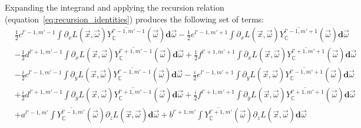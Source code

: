 Expanding the integrand and applying the recursion relation (equation~\ref{eq:recursion_identities}) produces the following set of terms:
\begin{align*}
&
\frac{1}{2}c^{{l'-1,m'-1}}\int{\partial_xL\left (\vec{x} ,\vec{\omega} \right )\overline{Y_{\mathbb{C}}^{l'-1, m'-1}}(\vec{\omega} )\mathbf{d}\vec{\omega}}
-\frac{1}{2}e^{{l'-1,m'+1}}\int{\partial_xL\left (\vec{x} ,\vec{\omega} \right )\overline{Y_{\mathbb{C}}^{l'-1, m'+1}}(\vec{\omega} )\mathbf{d}\vec{\omega}}
\\&
-\frac{1}{2}d^{{l'+1,m'-1}}\int{\partial_xL\left (\vec{x} ,\vec{\omega} \right )\overline{Y_{\mathbb{C}}^{l'+1, m'-1}}(\vec{\omega} )\mathbf{d}\vec{\omega}}
+\frac{1}{2}f^{{l'+1,m'+1}}\int{\partial_xL\left (\vec{x} ,\vec{\omega} \right )\overline{Y_{\mathbb{C}}^{l'+1, m'+1}}(\vec{\omega} )\mathbf{d}\vec{\omega}}
\\&
-\frac{i}{2}c^{{l'-1,m'-1}}\int{\partial_yL\left (\vec{x} ,\vec{\omega} \right )\overline{Y_{\mathbb{C}}^{l'-1, m'-1}}(\vec{\omega} )\mathbf{d}\vec{\omega}}
-\frac{i}{2}e^{{l'-1,m'+1}}\int{\partial_yL\left (\vec{x} ,\vec{\omega} \right )\overline{Y_{\mathbb{C}}^{l'-1, m'+1}}(\vec{\omega} )\mathbf{d}\vec{\omega}}
\\&
+\frac{i}{2}d^{{l'+1,m'-1}}\int{\partial_yL\left (\vec{x} ,\vec{\omega} \right )\overline{Y_{\mathbb{C}}^{l'+1, m'-1}}(\vec{\omega} )\mathbf{d}\vec{\omega}}
+\frac{i}{2}f^{{l'+1,m'+1}}\int{\partial_yL\left (\vec{x} ,\vec{\omega} \right )\overline{Y_{\mathbb{C}}^{l'+1, m'+1}}(\vec{\omega} )\mathbf{d}\vec{\omega}}
\\&
+a^{{l'-1,m'}}\int{\overline{Y_{\mathbb{C}}^{l'-1, m'}}(\vec{\omega} )\partial_zL\left (\vec{x} ,\vec{\omega} \right )\mathbf{d}\vec{\omega}}
+b^{{l'+1,m'}}\int{\overline{Y_{\mathbb{C}}^{l'+1, m'}}(\vec{\omega} )\partial_zL\left (\vec{x} ,\vec{\omega} \right )\mathbf{d}\vec{\omega}}
\end{align*}

